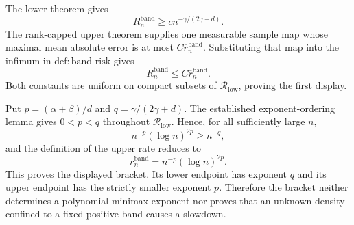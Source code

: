 The lower theorem gives
\[
R_n^{\mathrm{band}}\ge c n^{-\gamma/(2\gamma+d)}.
\]
The rank-capped upper theorem supplies one measurable sample map whose maximal
mean absolute error is at most \(C\overline r_n^{\mathrm{band}}\).
Substituting that map into the infimum in \(\mathrm{def:band\mbox{-}risk}\)
gives
\[
R_n^{\mathrm{band}}\le C\overline r_n^{\mathrm{band}}.
\]
Both constants are uniform on compact subsets of
\(\mathcal R_{\mathrm{low}}\), proving the first display.

Put \(p=(\alpha+\beta)/d\) and
\(q=\gamma/(2\gamma+d)\).  The established exponent-ordering lemma gives
\(0<p<q\) throughout \(\mathcal R_{\mathrm{low}}\).  Hence, for all
sufficiently large \(n\),
\[
n^{-p}(\log n)^{2p}\ge n^{-q},
\]
and the definition of the upper rate reduces to
\[
\overline r_n^{\mathrm{band}}
=n^{-p}(\log n)^{2p}.
\]
This proves the displayed bracket.  Its lower endpoint has exponent \(q\)
and its upper endpoint has the strictly smaller exponent \(p\).  Therefore
the bracket neither determines a polynomial minimax exponent nor proves that
an unknown density confined to a fixed positive band causes a slowdown.